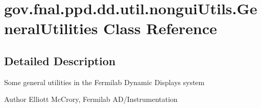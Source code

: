 \hypertarget{classgov_1_1fnal_1_1ppd_1_1dd_1_1util_1_1nonguiUtils_1_1GeneralUtilities}{\section{gov.\-fnal.\-ppd.\-dd.\-util.\-nongui\-Utils.\-General\-Utilities Class Reference}
\label{classgov_1_1fnal_1_1ppd_1_1dd_1_1util_1_1nonguiUtils_1_1GeneralUtilities}
}


\subsection{Detailed Description}
Some general utilities in the Fermilab Dynamic Displays system

\begin{DoxyAuthor}{Author}
Elliott Mc\-Crory, Fermilab A\-D/\-Instrumentation 
\end{DoxyAuthor}
